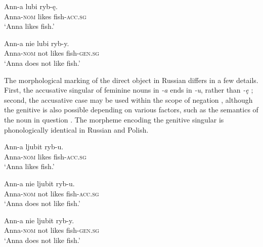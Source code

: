 \documentclass[output=paper,            colorlinks, citecolor=brown            		  ]{langscibook}
\begin{document}
\ea\label{ex:saturno:3}  
    \ea\label{ex:saturno:3a}
    \gll Ann-a    lubi  ryb-ę.\\
    Anna-\textsc{nom}  likes  fish-\textsc{acc.sg}\\ 
    \glt ‘Anna likes fish.’ 

  \ex\label{ex:saturno:3b}  
  \gll Ann-a    nie  lubi  ryb-y.\\
    Anna-\textsc{nom}  not  likes  fish-\textsc{gen.sg}\\ 
   \glt  ‘Anna does not like fish.’ 
\z
\z

The morphological marking of the direct object in Russian differs in a few details. First, the accusative singular of feminine nouns in \textit{{}-a} ends in \textit{{}-u}, rather than \textit{{}-ę} ; second, the accusative case may be used within the scope of negation , although the genitive is also possible  depending on various factors, such as the semantics of the noun in question \citep{Harves2013}. The morpheme encoding the genitive singular is phonologically identical in Russian and Polish.

\ea\label{ex:saturno:4}
    \ea\label{ex:saturno:4a} 
    \gll Ann-a    ljubit  ryb-u.\\
    Anna-\textsc{nom}  likes  fish-\textsc{acc.sg}\\ 
   \glt  ‘Anna likes fish.’

  \ex\label{ex:saturno:4b}  
  \gll Ann-a    nie  ljubit  ryb-u.\\
    Anna-\textsc{nom}  not  likes  fish-\textsc{acc.sg}\\ 
   \glt ‘Anna does not like fish.’

    \ex\label{ex:saturno:4c} 
    \gll Ann-a    nie  ljubit  ryb-y.\\
    Anna-\textsc{nom}  not  likes  fish-\textsc{gen.sg}\\ 
   \glt ‘Anna does not like fish.’
   \z
\z
\end{document}
